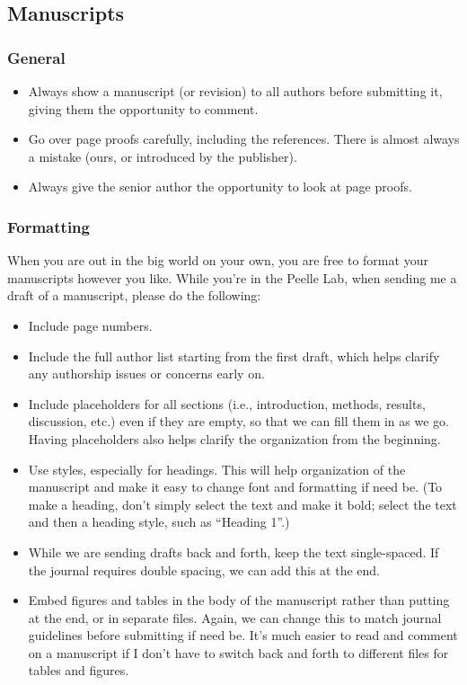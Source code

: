 \documentclass[letterpaper,12pt,oneside]{memoir}
\begin{document}
\subsection{Manuscripts}

\subsubsection{General}

\begin{itemize}
\item Always show a manuscript (or revision) to all authors before submitting it, giving them the opportunity to comment.
\item Go over page proofs carefully, including the references. There is almost always a mistake (ours, or introduced by the publisher).
\item Always give the senior author the opportunity to look at page proofs.
\end{itemize}

\subsubsection{Formatting}

When you are out in the big world on your own, you are free to format your manuscripts however you like. While you're in the Peelle Lab, when sending me a draft of a manuscript, please do the following:

\begin{itemize}
\item Include page numbers.
\item Include the full author list starting from the first draft, which helps clarify any authorship issues or concerns early on.
\item Include placeholders for all sections (i.e., introduction, methods, results, discussion, etc.) even if they are empty, so that we can fill them in as we go. Having placeholders also helps clarify the organization from the beginning.
\item Use styles, especially for headings. This will help organization of the manuscript and make it easy to change font and formatting if need be. (To make a heading, don't simply select the text and make it bold; select the text and then a heading style, such as ``Heading 1''.)
\item While we are sending drafts back and forth, keep the text single-spaced. If the journal requires double spacing, we can add this at the end.
\item Embed figures and tables in the body of the manuscript rather than putting at the end, or in separate files. Again, we can change this to match journal guidelines before submitting if need be. It's much easier to read and comment on a manuscript if I don't have to switch back and forth to different files for tables and figures.
\end{itemize}
\end{document}
